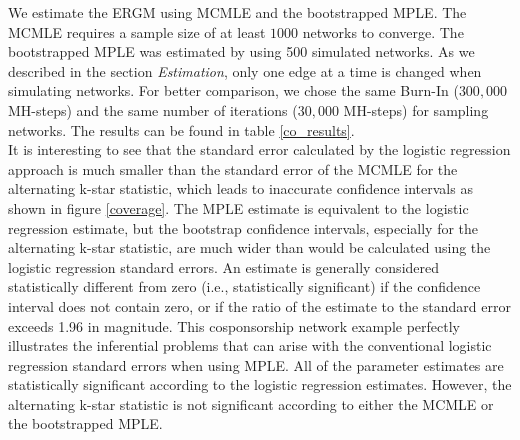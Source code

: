 \documentclass{llncs}
\begin{document}
\indent We estimate the ERGM using MCMLE and the bootstrapped MPLE. The MCMLE requires a sample size of at least $1000$ networks to converge. The bootstrapped MPLE was estimated by using 500 simulated networks. As we described in the section {\it Estimation}, only one edge at a time is changed when simulating networks. For better comparison, we chose the same Burn-In ($300,000$ MH-steps) and the same number of iterations ($30,000$ MH-steps) for sampling networks. The results can be found in table \ref{co_results}.\\
\indent It is interesting to see that the standard error calculated by the logistic regression approach is much smaller than the standard error of the MCMLE for the alternating k-star statistic, which leads to inaccurate confidence intervals as shown in figure \ref{coverage}. The MPLE estimate is equivalent to the logistic regression estimate, but the bootstrap confidence intervals, especially for the alternating k-star statistic, are much wider than would be calculated using the logistic regression standard errors. An estimate is generally considered statistically different from zero (i.e., statistically significant) if the confidence interval does not contain zero, or if the ratio of the estimate to the standard error exceeds 1.96 in magnitude. This cosponsorship network example perfectly illustrates the inferential problems that can arise with the conventional logistic regression standard errors when using MPLE. All of the parameter estimates are statistically significant according to the logistic regression estimates. However, the alternating k-star statistic is not significant according to either the MCMLE or the bootstrapped MPLE.
\end{document}
